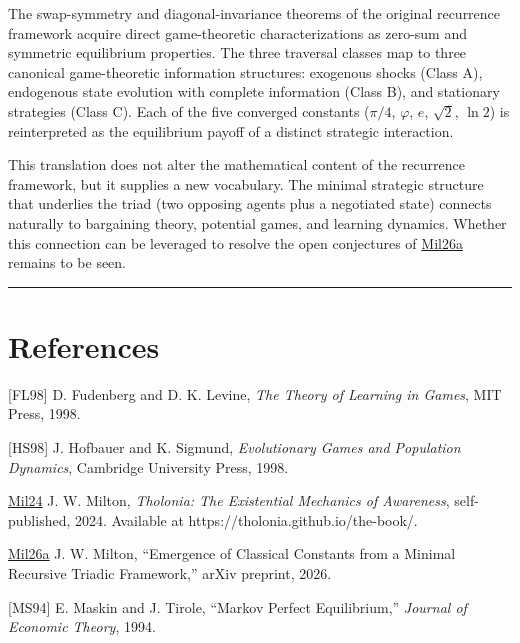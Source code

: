 \documentclass[12pt]{article}
\begin{document}
The swap-symmetry and diagonal-invariance theorems of the original
recurrence framework acquire direct game-theoretic characterizations as
zero-sum and symmetric equilibrium properties. The three traversal
classes map to three canonical game-theoretic information structures:
exogenous shocks (Class A), endogenous state evolution with complete
information (Class B), and stationary strategies (Class C). Each of the
five converged constants (\(\pi/4\), \(\varphi\), \(e\), \(\sqrt{2}\),
\(\ln 2\)) is reinterpreted as the equilibrium payoff of a distinct
strategic interaction.

This translation does not alter the mathematical content of the
recurrence framework, but it supplies a new vocabulary. The minimal
strategic structure that underlies the triad (two opposing agents plus a
negotiated state) connects naturally to bargaining theory, potential
games, and learning dynamics. Whether this connection can be leveraged
to resolve the open conjectures of
\href{https://github.com/baardev/truevalue/blob/main/docnav/Research/papers/1_recursive-tholonic-five-constants/1_recursive-tholonic-five-constants.pdf}{Mil26a}
remains to be seen.

\begin{center}\rule{0.5\linewidth}{0.5pt}\end{center}

\section{References}\label{references}

{[}FL98{]} D. Fudenberg and D. K. Levine, \emph{The Theory of Learning
in Games}, MIT Press, 1998.

{[}HS98{]} J. Hofbauer and K. Sigmund, \emph{Evolutionary Games and
Population Dynamics}, Cambridge University Press, 1998.

\href{https://tholonia.github.io/the-book/}{Mil24} J. W. Milton,
\emph{Tholonia: The Existential Mechanics of Awareness}, self-published,
2024. Available at https://tholonia.github.io/the-book/.

\href{https://github.com/baardev/truevalue/blob/main/docnav/Research/papers/1_recursive-tholonic-five-constants/1_recursive-tholonic-five-constants.pdf}{Mil26a}
J. W. Milton, ``Emergence of Classical Constants from a Minimal
Recursive Triadic Framework,'' arXiv preprint, 2026.

{[}MS94{]} E. Maskin and J. Tirole, ``Markov Perfect Equilibrium,''
\emph{Journal of Economic Theory}, 1994.
\end{document}
